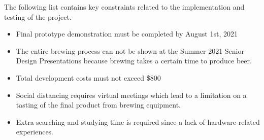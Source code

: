 

The following list contains key constraints related to the implementation and testing of the project.

\begin{itemize}
  \item Final prototype demonstration must be completed by August 1st, 2021 
  \item The entire brewing process can not be shown at the Summer 2021 Senior Design Presentations because brewing takes a certain time to produce beer. 
  \item Total development costs must not exceed \$800 
  \item Social distancing requires virtual meetings which lead to a limitation on a tasting of the final product from brewing equipment. 
  \item Extra searching and studying time is required since a lack of hardware-related experiences.
\end{itemize}